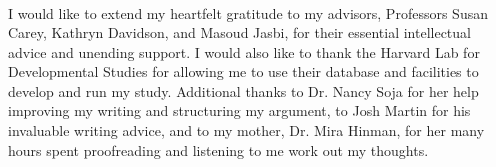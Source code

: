 \singlespacing
\mbox{}\\
\mbox{}\\
\mbox{}\\
\mbox{}\\
\mbox{}\\
\mbox{}\\
\mbox{}\\
\mbox{}\\
\mbox{}\\
\mbox{}\\
\mbox{}\\
\mbox{}\\
\mbox{}\\
\mbox{}\\
\mbox{}\\
\mbox{}\\



\newpage
\doublespacing
{}
\vspace*{\fill}
\begin{center}
I would like to extend my heartfelt gratitude to my advisors, Professors Susan Carey, Kathryn Davidson, and Masoud Jasbi, for their essential intellectual advice and unending support. I would also like to thank the Harvard Lab for Developmental Studies for allowing me to use their database and facilities to develop and run my study. Additional thanks to Dr. Nancy Soja for her help improving my writing and structuring my argument, to Josh Martin for his invaluable writing advice, and to my mother, Dr. Mira Hinman, for her many hours spent proofreading and listening to me work out my thoughts.
\end{center}
\vspace*{\fill}
\newpage
